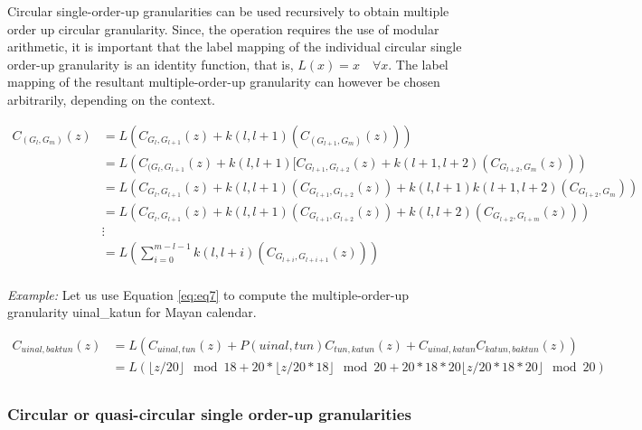 \documentclass[12pt]{article}
\begin{document}
Circular single-order-up granularities can be used recursively to obtain multiple order up circular granularity. Since, the operation requires the use of modular arithmetic, it is important that the label mapping of the individual circular single order-up granularity is an identity function, that is, \(L(x) = x\quad \forall x\). The label mapping of the resultant multiple-order-up granularity can however be chosen arbitrarily, depending on the context.

\begin{equation} \label{eq:eq7}
\begin{split}
C_{(G_l,G_m)}(z) & = L(C_{G_l,G_{l+1}}(z) + k(l, l+1)(C_{(G_{l+1},G_m)}(z))) \\  
  & =   L(C_{(G_l,G_{l+1}}(z) + k(l, l+1)[ C_{G_{l+1},G_{l+2}}(z) + k(l+1, l+2)( C_{G_{l+2}, G_m}(z))) \\
  & =  L(C_{G_l,G_{l+1}}(z) + k(l, l+1)(C_{G_{l+1},G_{l+2}}(z)) + k(l, l+1)k(l+1, l+2)(C_{G_{l+2}, G_{m}}))\\
  & =  L(C_{G_l,G_{l+1}}(z) + k(l, l+1)(C_{G_{l+1},G_{l+2}}(z)) + k(l, l+2)(C_{G_{l+2},G_{l+m}}(z)))\\
  &\vdots\\
  & = L(\sum_{i=0}^{m - l - 1} k(l, l+i)(C_{G_{l+i},G_{l+i+1}}(z)))\\
\end{split}
\end{equation}

\emph{Example:} Let us use Equation \ref{eq:eq7} to compute the multiple-order-up granularity uinal\_katun for Mayan calendar.

\begin{equation} \label{eq8}
\begin{split}
C_{uinal, baktun}(z) & = L(C_{uinal, tun}(z) + P(uinal, tun)C_{tun,katun}(z) + C_{uinal, katun}C_{katun, baktun}(z)) \\
              & = L(\lfloor z/20\rfloor \mod 18  + 20*\lfloor z/20*18\rfloor \mod 20 + 20*18*20\lfloor z/20*18*20\rfloor \mod 20) \\
\end{split}
\end{equation}

\hypertarget{circular-or-quasi-circular-single-order-up-granularities}{%
\subsubsection{Circular or quasi-circular single order-up granularities}\label{circular-or-quasi-circular-single-order-up-granularities}}
\end{document}
